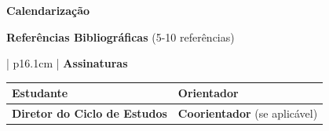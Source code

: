 \documentclass[a4paper, 12pt]{article}
\begin{document}
\begin{textbox}
\small{\textbf{Calendarização}}\tiny{} \small

\end{textbox}

\begin{textbox}
\small{\textbf{Referências Bibliográficas}} \tiny{(5-10 referências)} \small

\end{textbox}

\clearpage

\begin{table}[h!]
   \begin{tabular}{| p{16.1cm} |}\hline
       \small{\textbf{Assinaturas}} \tiny{}
       \\[1em]
       \begin{tabular}{| p{7.62cm} | p{7.62cm} | }
           \hline
           \small{\textbf{Estudante}} &  \small{\textbf{Orientador}}
           \\[10em]\hline
           
           \small{\textbf{Diretor do Ciclo de Estudos}} & \small{\textbf{Coorientador} (se aplicável)}
           \\[10em]\hline
       \end{tabular}
       \\[10.5em]\hline
   \end{tabular}
\end{table}
\end{document}
